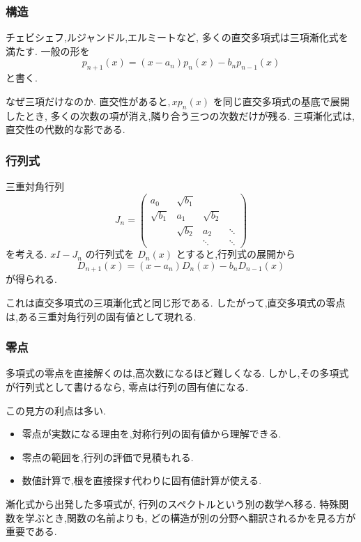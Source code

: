 \subsubsection{構造}

チェビシェフ,ルジャンドル,エルミートなど,
多くの直交多項式は三項漸化式を満たす.
一般の形を
\[
  p_{n+1}(x)
  =(x-a_n)p_n(x)-b_np_{n-1}(x)
\]
と書く.

なぜ三項だけなのか.
直交性があると,\,$xp_n(x)$ を同じ直交多項式の基底で展開したとき,
多くの次数の項が消え,隣り合う三つの次数だけが残る.
三項漸化式は,直交性の代数的な影である.

\subsubsection{行列式}

三重対角行列
\[
  J_n=
  \begin{pmatrix}
    a_0&\sqrt{b_1}&&\\
    \sqrt{b_1}&a_1&\sqrt{b_2}&\\
    &\sqrt{b_2}&a_2&\ddots\\
    &&\ddots&\ddots
  \end{pmatrix}
\]
を考える.
$xI-J_n$ の行列式を $D_n(x)$ とすると,行列式の展開から
\[
  D_{n+1}(x)
  =(x-a_n)D_n(x)-b_nD_{n-1}(x)
\]
が得られる.

これは直交多項式の三項漸化式と同じ形である.
したがって,直交多項式の零点は,ある三重対角行列の固有値として現れる.

\subsubsection{零点}

多項式の零点を直接解くのは,高次数になるほど難しくなる.
しかし,その多項式が行列式として書けるなら,
零点は行列の固有値になる.

この見方の利点は多い.

\begin{itemize}
  \item 零点が実数になる理由を,対称行列の固有値から理解できる.
  \item 零点の範囲を,行列の評価で見積もれる.
  \item 数値計算で,根を直接探す代わりに固有値計算が使える.
\end{itemize}

漸化式から出発した多項式が,
行列のスペクトルという別の数学へ移る.
特殊関数を学ぶとき,関数の名前よりも,
どの構造が別の分野へ翻訳されるかを見る方が重要である.

